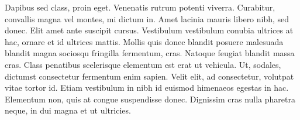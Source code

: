 \documentclass[]{article}
\begin{document}
Dapibus sed class, proin eget. Venenatis rutrum potenti viverra.
Curabitur, convallis magna vel montes, mi dictum in. Amet lacinia mauris
libero nibh, sed donec. Elit amet ante suscipit cursus. Vestibulum
vestibulum conubia ultrices at hac, ornare et id ultrices mattis. Mollis
quis donec blandit posuere malesuada blandit magna sociosqu fringilla
fermentum, cras. Natoque feugiat blandit massa cras. Class penatibus
scelerisque elementum est erat ut vehicula. Ut, sodales, dictumst
consectetur fermentum enim sapien. Velit elit, ad consectetur, volutpat
vitae tortor id. Etiam vestibulum in nibh id euismod himenaeos egestas
in hac. Elementum non, quis at congue suspendisse donec. Dignissim cras
nulla pharetra neque, in dui magna et ut ultricies.
\end{document}
